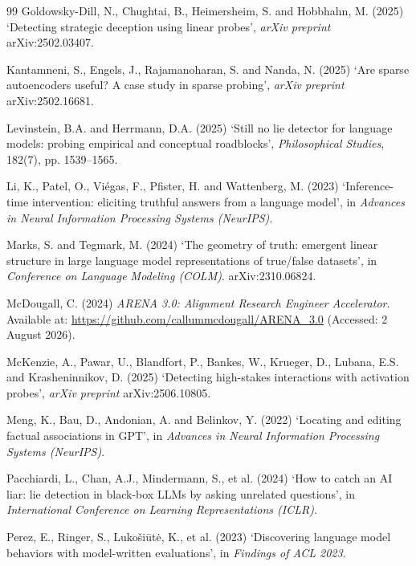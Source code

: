 \documentclass[conference]{IEEEtran}
\begin{document}
\begin{thebibliography}{99}
Goldowsky-Dill, N., Chughtai, B., Heimersheim, S. and Hobbhahn, M. (2025)
`Detecting strategic deception using linear probes', \textit{arXiv preprint}
arXiv:2502.03407.

Kantamneni, S., Engels, J., Rajamanoharan, S. and Nanda, N. (2025) `Are sparse
autoencoders useful? A case study in sparse probing', \textit{arXiv preprint}
arXiv:2502.16681.

Levinstein, B.A. and Herrmann, D.A. (2025) `Still no lie detector for language
models: probing empirical and conceptual roadblocks',
\textit{Philosophical Studies}, 182(7), pp. 1539--1565.

Li, K., Patel, O., Vi\'egas, F., Pfister, H. and Wattenberg, M. (2023)
`Inference-time intervention: eliciting truthful answers from a language model',
in \textit{Advances in Neural Information Processing Systems (NeurIPS)}.

Marks, S. and Tegmark, M. (2024) `The geometry of truth: emergent linear
structure in large language model representations of true/false datasets', in
\textit{Conference on Language Modeling (COLM)}. arXiv:2310.06824.

McDougall, C. (2024) \textit{ARENA 3.0: Alignment Research Engineer
Accelerator}. Available at: \url{https://github.com/callummcdougall/ARENA_3.0}
(Accessed: 2 August 2026).

McKenzie, A., Pawar, U., Blandfort, P., Bankes, W., Krueger, D., Lubana, E.S.
and Krasheninnikov, D. (2025) `Detecting high-stakes interactions with
activation probes', \textit{arXiv preprint} arXiv:2506.10805.

Meng, K., Bau, D., Andonian, A. and Belinkov, Y. (2022) `Locating and editing
factual associations in GPT', in \textit{Advances in Neural Information
Processing Systems (NeurIPS)}.

Pacchiardi, L., Chan, A.J., Mindermann, S., et al. (2024) `How to catch an AI
liar: lie detection in black-box LLMs by asking unrelated questions', in
\textit{International Conference on Learning Representations (ICLR)}.

Perez, E., Ringer, S., Luko\v{s}i\=ut\.e, K., et al. (2023) `Discovering language
model behaviors with model-written evaluations', in \textit{Findings of ACL 2023}.


\end{thebibliography}
\end{document}
